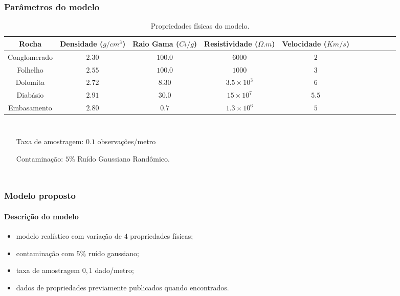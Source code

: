 \documentclass[aspectratio=10]{beamer} %
\begin{document}
\begin{frame}
\frametitle{Parâmetros do modelo}
\begin{table}[H]\tiny
	\caption{Propriedades físicas do modelo.}
	\begin{tabular}{@{}ccccccccccc@{}}
		\toprule
		Rocha & Densidade ($g/cm^{3}$) & Raio Gama ($Ci/g$) & Resistividade ($\Omega.m$)& Velocidade ($Km/s$) &\\ \midrule
		Conglomerado &     $2.30$ 		  &       $100.0$       &           $6000$           &			$2$   		   	&\\
		Folhelho	 &       $2.55$           &       $100.0$       &           $1000$           &     		$3$		 &\\
		Dolomita     &       $2.72$           &       $8.30$        &           $3.5 \times 10^{3}$           &  	$6$    			 &\\
		Diabásio    &       $2.91$           &       $30.0$        &           $15 \times 10^{7}$           &      $5.5$				 &\\
		Embasamento  &       $2.80$           &       $0.7$         &           $1.3 \times 10^{6}$           & 		$5$		     &\\ \bottomrule
	\end{tabular}
	
	\label{Tab1}
\end{table}
\begin{columns}
	\footnotesize
	\justifying
	\begin{itemize}\footnotesize
		\item[Taxa de amostragem:] $0.1$ observações/metro 
		\item[Contaminação:] $5$\% Ruído Gaussiano Randômico.
	\end{itemize}
\end{columns}
\end{frame}

\begin{frame}
\frametitle{Modelo proposto}
\framesubtitle{Descrição do modelo}
\begin{itemize}
\item modelo realístico com variação de $4$ propriedades físicas;
\pause
\item contaminação com $5\%$ ruído gaussiano;
\pause
\item taxa de amostragem $0,1$ dado/metro;
\pause
\item dados de propriedades previamente publicados quando encontrados.
\end{itemize}

\end{frame}
\end{document}
